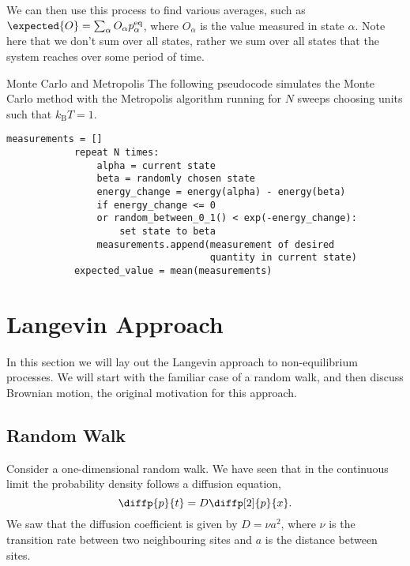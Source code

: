 \documentclass[fleqn]{NotesClass}
\newcommand*{\boltzmann}{k_{\mathrm{B}}}
\begin{document}
    We can then use this process to find various averages, such as \(\expected{O} = \sum_\alpha O_\alpha p_\alpha^{\mathrm{eq}}\), where \(O_\alpha\) is the value measured in state \(\alpha\).
    Note here that we don't sum over all states, rather we sum over all states that the system reaches over some period of time.
    
    \begin{cde}{Monte Carlo and Metropolis}{}
        The following pseudocode simulates the Monte Carlo method with the Metropolis algorithm running for \(N\) sweeps choosing units such that \(\boltzmann T = 1\).
        \begin{lstlisting}[gobble=12]
            measurements = []
            repeat N times:
                alpha = current state
                beta = randomly chosen state
                energy_change = energy(alpha) - energy(beta)
                if energy_change <= 0 
                or random_between_0_1() < exp(-energy_change):
                    set state to beta
                measurements.append(measurement of desired
                                    quantity in current state)
            expected_value = mean(measurements)
        \end{lstlisting}
    \end{cde}
    
    \chapter{Langevin Approach}
    In this section we will lay out the Langevin approach to non-equilibrium processes.
    We will start with the familiar case of a random walk, and then discuss Brownian motion, the original motivation for this approach.
    
    \section{Random Walk}
    Consider a one-dimensional random walk.
    We have seen that in the continuous limit the probability density follows a diffusion equation,
    \begin{equation}
        \diffp{p}{t} = D\diffp[2]{p}{x}.
    \end{equation}
    We saw that the diffusion coefficient is given by \(D = \nu a^2\), where \(\nu\) is the transition rate between two neighbouring sites and \(a\) is the distance between sites.
    
\end{document}
